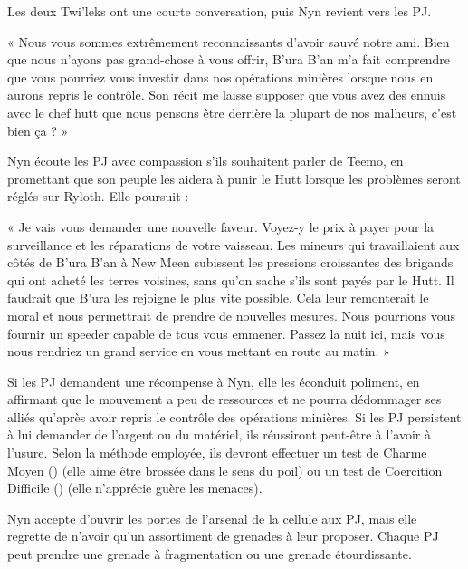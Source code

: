\documentclass[a4paper,10pt,twoside,twocolumn,openany]{book}
\begin{document}
Les deux Twi’leks ont une courte conversation, puis
Nyn revient vers les PJ.

\begin{quotebox}
    
« Nous vous sommes extrêmement reconnaissants
d’avoir sauvé notre ami. Bien que nous n’ayons
pas grand-chose à vous offrir, B’ura B’an m’a fait
comprendre que vous pourriez vous investir dans
nos opérations minières lorsque nous en aurons
repris le contrôle. Son récit me laisse supposer que
vous avez des ennuis avec le chef hutt que nous
pensons être derrière la plupart de nos malheurs,
c’est bien ça ? »\end{quotebox}

Nyn écoute les PJ avec compassion s’ils souhaitent
parler de Teemo, en promettant que son peuple les aidera à punir le Hutt lorsque les problèmes seront réglés sur
Ryloth. Elle poursuit :

\begin{quotebox}
    
« Je vais vous demander une nouvelle faveur.
Voyez-y le prix à payer pour la surveillance et
les réparations de votre vaisseau. Les mineurs
qui travaillaient aux côtés de B’ura B’an à New
Meen subissent les pressions croissantes des
brigands qui ont acheté les terres voisines, sans
qu’on sache s’ils sont payés par le Hutt. Il faudrait
que B’ura les rejoigne le plus vite possible. Cela
leur remonterait le moral et nous permettrait de
prendre de nouvelles mesures. Nous pourrions
vous fournir un speeder capable de tous vous
emmener. Passez la nuit ici, mais vous nous rendriez un grand service en vous mettant en route
au matin. »\end{quotebox}

Si les PJ demandent une récompense à Nyn, elle les
éconduit poliment, en affirmant que le mouvement a
peu de ressources et ne pourra dédommager ses alliés
qu’après avoir repris le contrôle des opérations minières.
Si les PJ persistent à lui demander de l’argent ou du
matériel, ils réussiront peut-être à l’avoir à l’usure. Selon
la méthode employée, ils devront effectuer un test de
Charme Moyen (\difficulty \difficulty) (elle aime être brossée dans le
sens du poil) ou un test de Coercition Difficile (\difficulty \difficulty \difficulty)
(elle n’apprécie guère les menaces).

\successA Nyn accepte d’ouvrir les portes de l’arsenal de
la cellule aux PJ, mais elle regrette de n’avoir qu’un assortiment de grenades à leur proposer. Chaque PJ peut prendre une grenade à fragmentation ou une grenade étourdissante.
\end{document}
